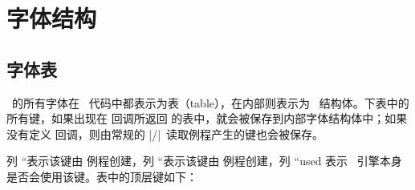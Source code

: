 \chapter{字体结构}\label{fonts}

\section{字体表}


\TEX\ 的所有字体在 \LUA\ 代码中都表示为表（table），在内部则表示为
\CCODE~结构体。下表中的所有键，如果出现在  回调所返回
的表中，就会被保存到内部字体结构体中；如果没有定义 
回调，则由常规的 \TFM|/|\VF\ 读取例程产生的键也会被保存。

列 ``\VF 表示该键由  例程创建，列
``\TFM 表示该键由  例程创建，列 ``used
表示 \LUATEX\ 引擎本身是否会使用该键。表中的顶层键如下：

